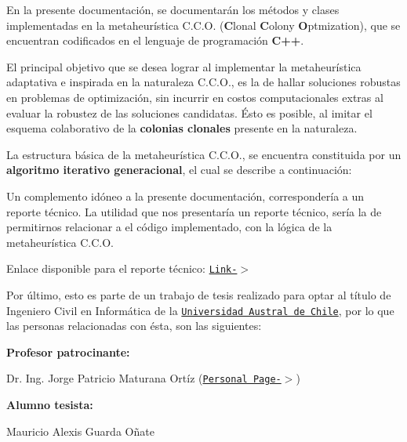 En la presente documentación, se documentarán los métodos y clases implementadas en la metaheurística C.\+C.\+O. ({\bfseries C}lonal {\bfseries C}olony {\bfseries O}ptmization), que se encuentran codificados en el lenguaje de programación {\bfseries C++}.

El principal objetivo que se desea lograr al implementar la metaheurística adaptativa e inspirada en la naturaleza C.\+C.\+O., es la de hallar soluciones robustas en problemas de optimización, sin incurrir en costos computacionales extras al evaluar la robustez de las soluciones candidatas. Ésto es posible, al imitar el esquema colaborativo de la {\bfseries colonias clonales} presente en la naturaleza.

La estructura básica de la metaheurística C.\+C.\+O., se encuentra constituida por un {\bfseries algoritmo iterativo generacional}, el cual se describe a continuación\+:



Un complemento idóneo a la presente documentación, correspondería a un reporte técnico. La utilidad que nos presentaría un reporte técnico, sería la de permitirnos relacionar a el código implementado, con la lógica de la metaheurística C.\+C.\+O. 
\begin{DoxyItemize}
\item Enlace disponible para el reporte técnico\+: \href{../html2/HTLATEXDocumentacionCCO.html}{\tt Link-\/$>$}  
\end{DoxyItemize}

Por último, esto es parte de un trabajo de tesis realizado para optar al título de Ingeniero Civil en Informática de la \href{www.uach.cl}{\tt Universidad Austral de Chile}, por lo que las personas relacionadas con ésta, son las siguientes\+:

{\bfseries Profesor patrocinante\+:} 
\begin{DoxyItemize}
\item Dr. Ing. Jorge Patricio Maturana Ortíz (\href{http://www.inf.uach.cl/maturana/}{\tt Personal Page-\/$>$})  
\end{DoxyItemize}{\bfseries Alumno tesista\+:} 
\begin{DoxyItemize}
\item Mauricio Alexis Guarda Oñate 
\end{DoxyItemize}